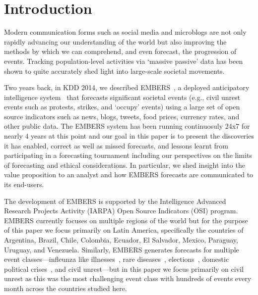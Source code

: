 \section{Introduction}
Modern communication forms such as social media and microblogs are not only rapidly
advancing our understanding of the world but also improving the methods by which we can 
comprehend, and even forecast, the progression of events.
Tracking population-level activities via `massive passive' data has been shown to 
quite accurately shed light into large-scale societal movements. 

Two years back, in KDD 2014, we described EMBERS~\cite{beatingthenews-kdd}, a deployed anticipatory
intelligence system~\cite{bigdata-andy-doyle-embers-paper} that forecasts significant 
societal events (e.g., civil unrest
events such as protests, strikes, and `occupy' events) using a large set of open source
indicators such as news, blogs, tweets, food prices, currency rates, and other public
data. The EMBERS system has been running continuosuly 24x7 for nearly 4 years at this point
and our goal in this paper is to present the discoveries it has enabled,
correct as well as missed
forecasts, and lessons learnt from participating in a forecasting tournament including
our perspectives on the limits of forecasting and ethical considerations. In
particular, we shed insight into the value proposition to an analyst and how EMBERS forecasts
are communicated to its end-users. 

The development of EMBERS is supported by the Intelligence Advanced Research Projects
Activity (IARPA) Open Source Indicators (OSI) program. 
EMBERS currently focuses on multiple regions of the world but for the purpose of this paper
we focus primarily on Latin America, specifically the countries of
Argentina, Brazil, Chile, Colombia, Ecuador, El Salvador, Mexico, Paraguay, Uruguay, and Venezuela.
Similarly, EMBERS generates forecasts for multiple event classes---infleunza like illnesses~\cite{prithwish-ili},
rare diseases~\cite{sdm-saurav}, elections~\cite{aravindan-wei-besc}, domestic political crises~\cite{gdelt-acm-webscience}, and civil unrest---but in this paper we focus primarily on civil unrest as this was the
most challenging event class with hundreds of events every month across the countries studied here.

